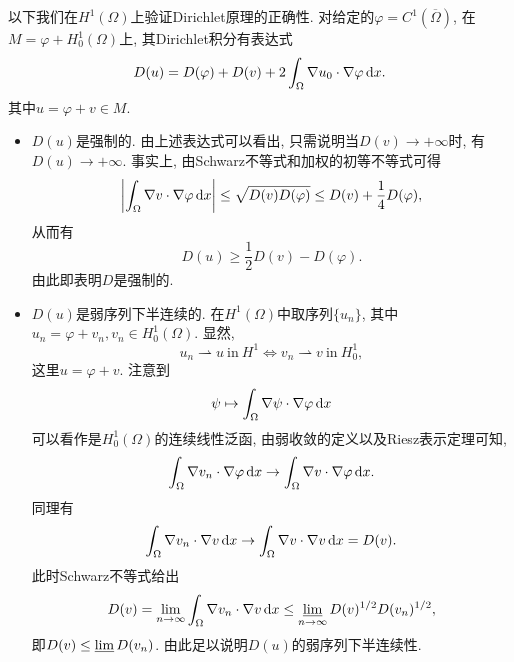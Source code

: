 以下我们在$H^1(\Omega)$上验证Dirichlet原理的正确性.
对给定的$\varphi = C^1(\overline{\Omega})$, 在$M = \varphi + H_0^1(\Omega)$上, 其Dirichlet积分有表达式 
\begin{equation*}
    D(u) = D(\varphi) + D(v) + 2\int_{\Omega}\nabla u_0 \cdot \nabla \varphi \,{\rm d}x.
\end{equation*}
其中$u = \varphi + v \in M$.
\begin{itemize}
    \item $D(u)$是强制的. 由上述表达式可以看出, 只需说明当$D(v) \rightarrow +\infty$时, 有$D(u) \rightarrow +\infty$.
    事实上, 由Schwarz不等式和加权的初等不等式可得 
    \begin{equation*}
        \left|\int_{\Omega}\nabla v \cdot \nabla \varphi \,{\rm d}x\right| \leq \sqrt{D(v)D(\varphi)} \leq D(v) + \frac{1}{4}D(\varphi),
    \end{equation*}
    从而有 
    \begin{equation*}
        D(u) \geq \frac{1}{2}D(v) - D(\varphi).
    \end{equation*}
    由此即表明$D$是强制的.
    \item $D(u)$是弱序列下半连续的. 在$H^1(\Omega)$中取序列$\{u_n\}$, 其中$u_n = \varphi + v_n, v_n \in H_0^1(\Omega)$. 
    显然, 
    \begin{equation*}
        u_n \rightharpoonup u \ \text{in}\ H^1 \Leftrightarrow v_n \rightharpoonup v \ \text{in}\ H_0^1,
    \end{equation*}
    这里$u = \varphi + v$. 注意到
    \begin{equation*}
        \psi \mapsto \int_{\Omega}\nabla \psi \cdot \nabla \varphi \,{\rm d}x
    \end{equation*}
    可以看作是$H_0^1(\Omega)$的连续线性泛函, 由弱收敛的定义以及Riesz表示定理可知, 
    \begin{equation*}
        \int_{\Omega}\nabla v_n \cdot \nabla \varphi \,{\rm d}x \rightarrow \int_{\Omega}\nabla v \cdot \nabla \varphi \,{\rm d}x.
    \end{equation*}
    同理有 
    \begin{equation*}
        \int_{\Omega}\nabla v_n \cdot \nabla v \,{\rm d}x \rightarrow \int_{\Omega}\nabla v \cdot \nabla v \,{\rm d}x = D(v).
    \end{equation*}
    此时Schwarz不等式给出 
    \begin{equation*}
        D(v) = \lim\limits_{n \rightarrow \infty}\int_{\Omega}\nabla v_n \cdot \nabla v \,{\rm d}x \leq \varliminf\limits_{n \rightarrow \infty}D(v)^{1/2}D(v_n)^{1/2}, 
    \end{equation*}
    即$D(v) \leq \varliminf D(v_n)$. 由此足以说明$D(u)$的弱序列下半连续性.
\end{itemize}

